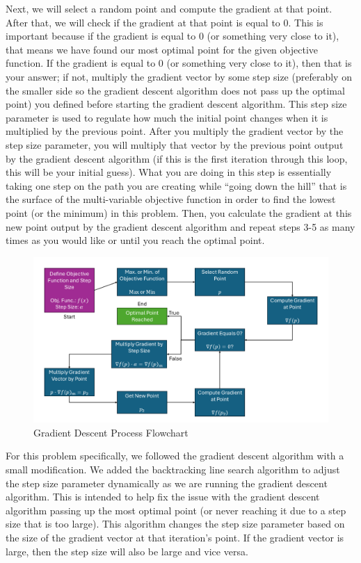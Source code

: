 \documentclass[10pt,letterpaper,onecolumn,report]{tau-class/tau}
\begin{document}
        Next, we will select a random point and compute the gradient at that point. After that, we will check if the gradient at that point is equal to 0. This is important because if the gradient is equal to 0 (or something very close to it), that means we have found our most optimal point for the given objective function. If the gradient is equal to 0 (or something very close to it), then that is your answer; if not, multiply the gradient vector by some step size (preferably on the smaller side so the gradient descent algorithm does not pass up the optimal point) you defined before starting the gradient descent algorithm. This step size parameter is used to regulate how much the initial point changes when it is multiplied by the previous point. After you multiply the gradient vector by the step size parameter, you will multiply that vector by the previous point output by the gradient descent algorithm (if this is the first iteration through this loop, this will be your initial guess). What you are doing in this step is essentially taking one step on the path you are creating while “going down the hill” that is the surface of the multi-variable objective function in order to find the lowest point (or the minimum) in this problem. Then, you calculate the gradient at this new point output by the gradient descent algorithm and repeat steps 3-5 as many times as you would like or until you reach the optimal point.

        \begin{figure}[H]
            \centering
            \setcounter{figure}{8} %
            \includegraphics[width=0.5\linewidth]{figures/Gradient Descent Process Diagram.png}
            \caption{Gradient Descent Process Flowchart}
            \label{fig:enter-label}
        \end{figure}

        For this problem specifically, we followed the gradient descent algorithm with a small modification. We added the backtracking line search algorithm to adjust the step size parameter dynamically as we are running the gradient descent algorithm. This is intended to help fix the issue with the gradient descent algorithm passing up the most optimal point (or never reaching it due to a step size that is too large). This algorithm changes the step size parameter based on the size of the gradient vector at that iteration’s point. If the gradient vector is large, then the step size will also be large and vice versa.
\end{document}
